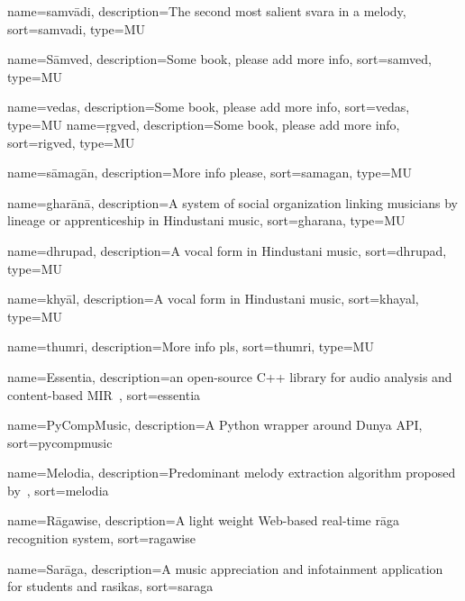{
	name={samv\={a}di},
	description={The second most salient svara in a melody},
	sort=samvadi,
	type=MU
}

{
	name={S\={a}mved},
	description={Some book, please add more info},
	sort=samved,
	type=MU
}

{
	name={vedas},
	description={Some book, please add more info},
	sort=vedas,
	type=MU
}
{
	name={\d{r}gved},
	description={Some book, please add more info},
	sort=rigved,
	type=MU
}

{
	name={s\={a}mag\={a}n},
	description={More info please},
	sort=samagan,
	type=MU
}

{
	name={ghar\={a}n\={a}},
	description={A system of social organization linking musicians by lineage or apprenticeship in Hindustani music},
	sort=gharana,
	type=MU
}

{
	name={dhrupad},
	description={A vocal form in Hindustani music},
	sort=dhrupad,
	type=MU
}

{
	name={khy\={a}l},
	description={A vocal form in Hindustani music},
	sort=khayal,
	type=MU
}

{
	name={thumri},
	description={More info pls},
	sort=thumri,
	type=MU
}


{
	name={Essentia},
	description={an open-source C++ library for audio analysis and content-based MIR~\citep{essentia}},
	sort=essentia
}

{
	name={PyCompMusic},
	description={A Python wrapper around Dunya API},
	sort=pycompmusic
}

{
	name={Melodia},
	description={Predominant melody extraction algorithm proposed by~\cite{Salamon2012}},
	sort=melodia
}

{
	name={R\={a}gawise},
	description={A light weight Web-based real-time r\={a}ga recognition system},
	sort=ragawise
}	

{
	name={Sar\={a}ga},
	description={A music appreciation and infotainment application for students and rasikas},
	sort=saraga
}

